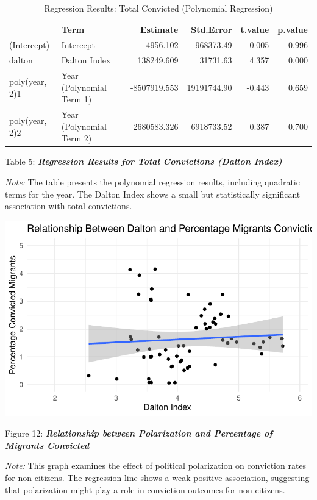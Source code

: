 \documentclass[
]{article}
\begin{document}
\begin{table}
\centering
\caption{Regression Results: Total Convicted (Polynomial Regression)}
\centering
\begin{tabular}[t]{l|l|r|r|r|r}
\hline
  & Term & Estimate & Std.Error & t.value & p.value\\
\hline
(Intercept) & Intercept & -4956.102 & 968373.49 & -0.005 & 0.996\\
\hline
dalton & Dalton Index & 138249.609 & 31731.63 & 4.357 & 0.000\\
\hline
poly(year, 2)1 & Year (Polynomial Term 1) & -8507919.553 & 19191744.90 & -0.443 & 0.659\\
\hline
poly(year, 2)2 & Year (Polynomial Term 2) & 2680583.326 & 6918733.52 & 0.387 & 0.700\\
\hline
\end{tabular}
\end{table}

Table 5: \textbf{\emph{Regression Results for Total Convictions (Dalton
Index)}}

\emph{Note:} The table presents the polynomial regression results,
including quadratic terms for the year. The Dalton Index shows a small
but statistically significant association with total convictions.

\includegraphics{DataMan_Project_files/figure-pdf/unnamed-chunk-42-1.pdf}

Figure 12: \textbf{\emph{Relationship between Polarization and
Percentage of Migrants Convicted}}

\emph{Note:} This graph examines the effect of political polarization on
conviction rates for non-citizens. The regression line shows a weak
positive association, suggesting that polarization might play a role in
conviction outcomes for non-citizens.
\end{document}
